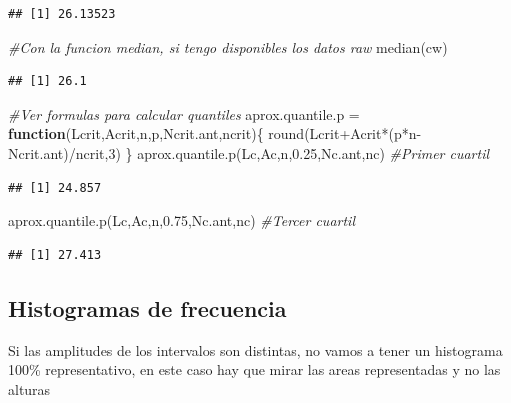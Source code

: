 \documentclass[
]{article}
\newenvironment{Shaded}{\begin{snugshade}}{\end{snugshade}}
\newcommand{\CommentTok}[1]{\textcolor[rgb]{0.56,0.35,0.01}{\textit{#1}}}
\newcommand{\ControlFlowTok}[1]{\textcolor[rgb]{0.13,0.29,0.53}{\textbf{#1}}}
\newcommand{\DecValTok}[1]{\textcolor[rgb]{0.00,0.00,0.81}{#1}}
\newcommand{\FloatTok}[1]{\textcolor[rgb]{0.00,0.00,0.81}{#1}}
\newcommand{\FunctionTok}[1]{\textcolor[rgb]{0.00,0.00,0.00}{#1}}
\newcommand{\NormalTok}[1]{#1}
\newcommand{\OtherTok}[1]{\textcolor[rgb]{0.56,0.35,0.01}{#1}}
\newcommand{\SpecialCharTok}[1]{\textcolor[rgb]{0.00,0.00,0.00}{#1}}
\begin{document}
\begin{verbatim}
## [1] 26.13523
\end{verbatim}

\begin{Shaded}
\begin{Highlighting}[]
\CommentTok{\#Con la funcion median, si tengo disponibles los datos raw}
\FunctionTok{median}\NormalTok{(cw)}
\end{Highlighting}
\end{Shaded}

\begin{verbatim}
## [1] 26.1
\end{verbatim}

\begin{Shaded}
\begin{Highlighting}[]
\CommentTok{\#Ver formulas para calcular quantiles}
\NormalTok{aprox.quantile.p }\OtherTok{=} \ControlFlowTok{function}\NormalTok{(Lcrit,Acrit,n,p,Ncrit.ant,ncrit)\{}
  \FunctionTok{round}\NormalTok{(Lcrit}\SpecialCharTok{+}\NormalTok{Acrit}\SpecialCharTok{*}\NormalTok{(p}\SpecialCharTok{*}\NormalTok{n}\SpecialCharTok{{-}}\NormalTok{Ncrit.ant)}\SpecialCharTok{/}\NormalTok{ncrit,}\DecValTok{3}\NormalTok{)}
\NormalTok{\}}
\FunctionTok{aprox.quantile.p}\NormalTok{(Lc,Ac,n,}\FloatTok{0.25}\NormalTok{,Nc.ant,nc) }\CommentTok{\#Primer cuartil}
\end{Highlighting}
\end{Shaded}

\begin{verbatim}
## [1] 24.857
\end{verbatim}

\begin{Shaded}
\begin{Highlighting}[]
\FunctionTok{aprox.quantile.p}\NormalTok{(Lc,Ac,n,}\FloatTok{0.75}\NormalTok{,Nc.ant,nc) }\CommentTok{\#Tercer cuartil}
\end{Highlighting}
\end{Shaded}

\begin{verbatim}
## [1] 27.413
\end{verbatim}

\hypertarget{histogramas-de-frecuencia}{%
\subsection{Histogramas de frecuencia}\label{histogramas-de-frecuencia}}

Si las amplitudes de los intervalos son distintas, no vamos a tener un
histograma 100\% representativo, en este caso hay que mirar las areas
representadas y no las alturas
\end{document}
